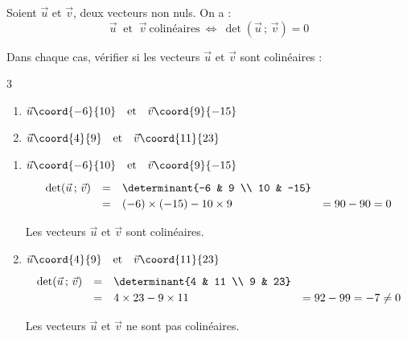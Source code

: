 \begin{prop}
	Soient $\vec{u}$ et $\vec{v}$, deux vecteurs non nuls. On a :
	\[
		\vec{u}\ \text{ et }\ \vec{v}\ \text{colinéaires}\ \iff\ \det(\vec{u}\,;\,\vec{v}) = 0
	\]
\end{prop}

\begin{methode}
	Dans chaque cas, vérifier si les vecteurs $\vec{u}$ et $\vec{v}$ sont colinéaires :
	\begin{multicols}{3}
		\begin{enumerate}
			\item $\vec{u}\coord{-6}{10}\quad\text{et}\quad\vec{v}\coord{9}{-15}$
			\item $\vec{u}\coord{4}{9}\quad\text{et}\quad\vec{v}\coord{11}{23}$
		\end{enumerate}
	\end{multicols}

	\begin{correction}
		\nline
		\begin{enumerate}[itemsep=2mm]
			\item $\vec{u}\coord{-6}{10}\quad\text{et}\quad\vec{v}\coord{9}{-15}$
			      \[
				      \def\arraystretch{1.2}
				      \begin{array}{rclll}
					      \det(\vec{u}\,;\,\vec{v}) & = & \determinant{-6              & 9             \\ 10 & -15} & \\
					                                & = & (-6)\times(-15) - 10\times 9 & = 90 - 90 = 0
				      \end{array}
			      \]

			      Les vecteurs $\vec{u}$ et $\vec{v}$ sont colinéaires.

			\item $\vec{u}\coord{4}{9}\quad\text{et}\quad\vec{v}\coord{11}{23}$
			      \[
				      \def\arraystretch{1.2}
				      \begin{array}{rcll}
					      \det(\vec{u}\,;\,\vec{v}) & = & \determinant{4         & 11                    \\ 9 & 23} & \\
					                                & = & 4\times23 - 9\times 11 & = 92 - 99 = -7 \neq 0
				      \end{array}
			      \]

			      Les vecteurs $\vec{u}$ et $\vec{v}$ ne sont pas colinéaires.
		\end{enumerate}
	\end{correction}
\end{methode}

